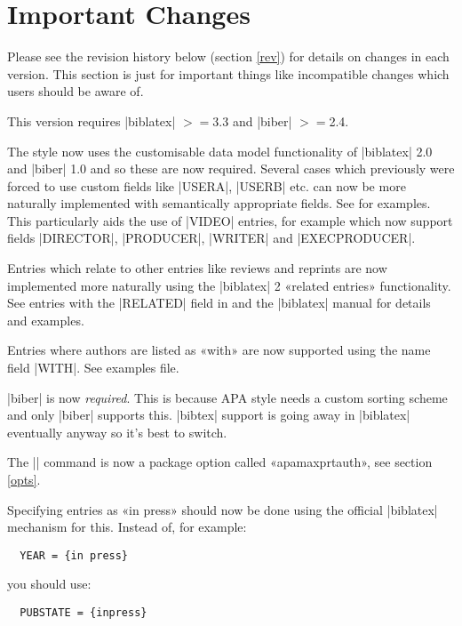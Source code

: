 \documentclass{ltxdockit}
\begin{document}
\printtitlepage
\tableofcontents

\section{Important Changes}\label{special}

Please see the revision history below (section \ref{rev}) for  details on changes in each
version. This section is just for important things like incompatible
changes which users should be aware of.

This version requires |biblatex| $>=$3.3 and |biber| $>=$2.4.

The style now uses the customisable data model functionality of |biblatex|
2.0 and |biber| 1.0 and so these are now required. Several cases
which previously were forced to use custom fields like |USERA|,
|USERB| etc. can now be more naturally implemented with semantically
appropriate fields. See  for
examples. This particularly aids the use of |VIDEO| entries, for
example which now support fields |DIRECTOR|, |PRODUCER|,
|WRITER| and |EXECPRODUCER|.

Entries which relate to other entries like reviews and reprints are
now implemented more naturally using the |biblatex| 2 «related
entries» functionality. See entries with the |RELATED| field in
 and the |biblatex| manual for
details and examples.

Entries where authors are listed as «with» are now supported using the
name field |WITH|. See examples file.

|biber| is now \emph{required}. This is because APA style needs a custom
sorting scheme and only |biber| supports this. |bibtex| support is going
away in |biblatex| eventually anyway so it's best to switch.

The |\maxprtauth| command is now a package option called
«apamaxprtauth», see section \ref{opts}.

Specifying entries as «in press» should now be done using the official |biblatex|
mechanism for this. Instead of, for example:

\begin{verbatim}
  YEAR = {in press}
\end{verbatim}

\noindent you should use:

\begin{verbatim}
  PUBSTATE = {inpress}
\end{verbatim}
\end{document}
